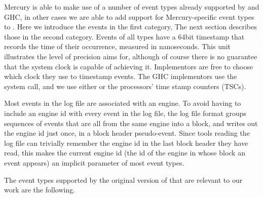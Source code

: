 Mercury is able to make use of a number of event types already supported by
\tscope and GHC,
in other cases we are able to add support for Mercury-specific event types to
\tscope.
Here we introduce the events in the first category,
The next section describes those in the second category.
Events of all types have a 64bit timestamp
that records the time of their occurrence, measured in nanoseconds.
This unit illustrates the level of precision \tscope aims for,
although of course there is no guarantee
that the system clock is capable of achieving it.
Implementors are free to choose which clock they use to timestamp events.
The GHC implementors use the  system call,
and we use either  or the processors' time stamp
counters (TSCs).

Most events in the log file are associated with an engine.
To avoid having to include an engine id with every event in the log file,
the log file format
groups sequences of events that are all from the same engine into a block,
and writes out the engine id just once, in a block header pseudo-event.
Since tools reading the log file can trivially remember
the engine id in the last block header they have read,
this makes the current engine id
(the id of the engine in whose block an event appears)
an implicit parameter of most event types.

The event types supported by the original version of \tscope
that are relevant to our work are the following.

